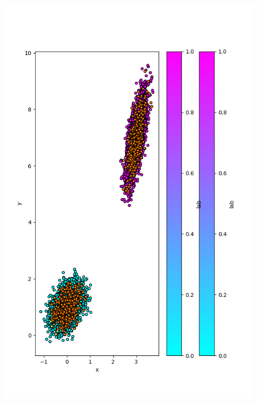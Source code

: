 \documentclass{article}
\begin{document}
\begin{enumerate}
  \noindent\includegraphics[scale=0.5]{plot_50}

\end{enumerate}
\end{document}
